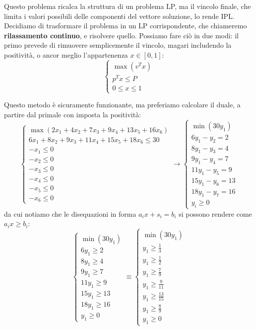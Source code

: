 \documentclass[a4paper,11pt]{article}
\begin{document}
Questo problema ricalca la struttura di un problema LP, ma il vincolo finale, che limita i valori possibili delle componenti del vettore soluzione, lo rende IPL.
Decidiamo di trasformare il problema in un LP corrispondente, che chiameremo \textbf{rilassamento continuo}, e risolvere quello.
Possiamo fare ciò in due modi: il primo prevede di rimuovere semplicemente il vincolo, magari includendo la positività, o ancor meglio l'appartenenza $x \in [0, 1]$:
\[
	\begin{cases}
		\max \left( v^T x \right) \\
		p^T x \leq P \\
		0 \leq x \leq 1
	\end{cases}
\]

Questo metodo è sicuramente funzionante, ma preferiamo calcolare il duale, a partire dal primale con imposta la positività:
\[
	\begin{cases}
		\max \left( 2x_1 + 4x_2 + 7x_3 + 9x_4 + 13x_5 + 16x_6 \right) \\ 
		6x_1 + 8x_2 + 9x_3 + 11x_4 + 15x_5 + 18x_6 \leq 30 \\
		-x_1 \leq 0 \\ 
		-x_2 \leq 0 \\ 
		-x_3 \leq 0 \\ 
		-x_4 \leq 0 \\ 
		-x_5 \leq 0 \\ 
		-x_6 \leq 0
	\end{cases}
	\rightarrow 
	\begin{cases}
		\min \left( 30y_1 \right) \\ 
		6 y_1 - y_2 = 2 \\
		8 y_1 - y_3 = 4 \\ 
		9 y_1 - y_4 = 7 \\ 
		11 y_1 - y_5 = 9 \\ 
		15 y_1 - y_6 = 13 \\ 
		18 y_1 - y_7 = 16 \\ 
		y_i \geq 0
	\end{cases}
\]
da cui notiamo che le disequazioni in forma $a_i x + s_i = b_i$ si possono rendere come $a_i x \geq b_i$: 
\[
	\begin{cases}
		\min \left( 30y_1 \right) \\ 
		6 y_1 \geq 2 \\
		8 y_1 \geq 4 \\ 
		9 y_1 \geq 7 \\ 
		11 y_1 \geq 9 \\ 
		15 y_1 \geq 13 \\ 
		18 y_1 \geq 16 \\ 
		y_1 \geq 0
	\end{cases} \equiv
	\begin{cases}
		\min \left( 30y_1 \right) \\ 
		y_1 \geq \frac{1}{3} \\
		y_1 \geq \frac{1}{2} \\ 
		y_1 \geq \frac{7}{9} \\ 
		y_1 \geq \frac{9}{11} \\ 
		y_1 \geq \frac{13}{15} \\ 
		y_1 \geq \frac{8}{9} \\ 
		y_1 \geq 0
	\end{cases}
\]
\end{document}
